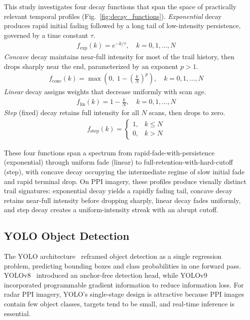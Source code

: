 \documentclass[twocolumn, 10pt]{article}
\begin{document}
This study investigates four decay functions that span the space of practically relevant temporal profiles (Fig.~\ref{fig:decay_functions}). \textit{Exponential} decay produces rapid initial fading followed by a long tail of low-intensity persistence, governed by a time constant $\tau$.
\begin{align}
	f_{\mathrm{exp}}(k) = e^{-k/\tau}, \quad k = 0, 1, \ldots, N
	\label{eq:exp_decay}
\end{align}
\textit{Concave} decay maintains near-full intensity for most of the trail history, then drops sharply near the end, parameterized by an exponent $p > 1$.
\begin{align}
	f_{\mathrm{conc}}(k) = \max\!\left(0,\; 1 - \left(\frac{k}{N}\right)^{p}\right), \quad k = 0, 1, \ldots, N
	\label{eq:concave_decay}
\end{align}
\textit{Linear} decay assigns weights that decrease uniformly with scan age.
\begin{align}
	f_{\mathrm{lin}}(k) = 1 - \frac{k}{N}, \quad k = 0, 1, \ldots, N
	\label{eq:linear_decay}
\end{align}
\textit{Step} (fixed) decay retains full intensity for all $N$ scans, then drops to zero.
\begin{align}
	f_{\mathrm{step}}(k) = \begin{cases} 1, & k \leq N \\ 0, & k > N \end{cases}
	\label{eq:step_decay}
\end{align}

These four functions span a spectrum from rapid-fade-with-persistence (exponential) through uniform fade (linear) to full-retention-with-hard-cutoff (step), with concave decay occupying the intermediate regime of slow initial fade and rapid terminal drop. On PPI imagery, these profiles produce visually distinct trail signatures: exponential decay yields a rapidly fading tail, concave decay retains near-full intensity before dropping sharply, linear decay fades uniformly, and step decay creates a uniform-intensity streak with an abrupt cutoff.

\subsection{YOLO Object Detection}

The YOLO architecture~\cite{Redmon2016YOLO} reframed object detection as a single regression problem, predicting bounding boxes and class probabilities in one forward pass. YOLOv8~\cite{Jocher2023YOLOv8} introduced an anchor-free detection head, while YOLOv9~\cite{Wang2024YOLOv9} incorporated programmable gradient information to reduce information loss. For radar PPI imagery, YOLO's single-stage design is attractive because PPI images contain few object classes, targets tend to be small, and real-time inference is essential.
\end{document}

